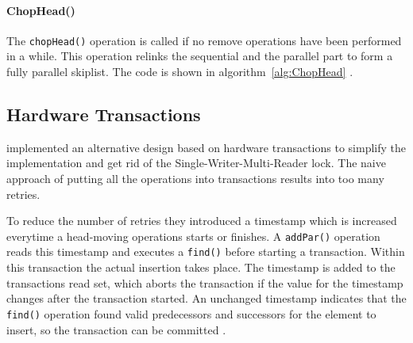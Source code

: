 \paragraph{ChopHead()}

The \texttt{chopHead()} operation is called if no remove operations have been performed in a while. This operation relinks the sequential and the parallel part to form a fully parallel skiplist. The code is shown in algorithm~\ref{alg:ChopHead} \cite{calciu_adaptive_2014}.

\subsection{Hardware Transactions}

\citeauthor{calciu_adaptive_2014} implemented an alternative design based on hardware transactions to simplify the implementation and get rid of the Single-Writer-Multi-Reader lock. The naive approach of putting all the operations into transactions results into too many retries. 

To reduce the number of retries they introduced a timestamp which is increased everytime a head-moving operations starts or finishes. A \texttt{addPar()} operation reads this timestamp and executes a \texttt{find()} before starting a transaction. Within this transaction the actual insertion takes place. The timestamp is added to the transactions read set, which aborts the transaction if the value for the timestamp changes after the transaction started. An unchanged timestamp indicates that the \texttt{find()} operation found valid predecessors and successors for the element to insert, so the transaction can be committed \cite{calciu_adaptive_2014}. 